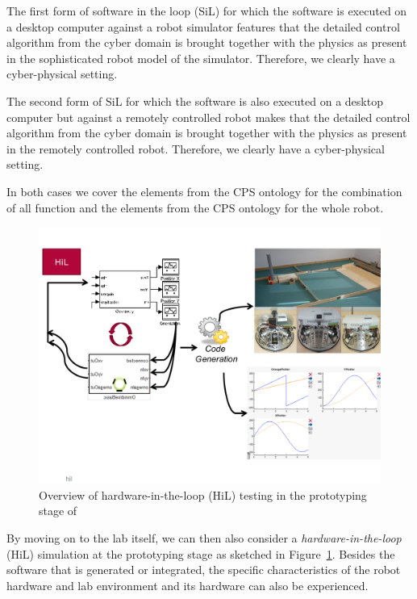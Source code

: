 %
The first form of software in the loop (SiL) for which the software is executed on a desktop computer against a robot simulator features that the detailed control algorithm from the cyber domain is brought together with the physics as present in the sophisticated robot model of the simulator. Therefore, we clearly have a cyber-physical setting. 

The second form of SiL for which the software is also executed on a desktop computer but against a remotely controlled robot makes that the detailed control algorithm from the cyber domain is brought together with the physics as present in the remotely controlled robot. Therefore, we clearly have a cyber-physical setting. 

In both cases we cover the elements \CPSCyberPart from the CPS ontology for the combination of all function and the elements \CPSPhysicalPart from the CPS ontology for the whole robot.


\begin{figure}[!htb]
\centering
\includegraphics[scale=0.33]{figures/hil.pdf}
\caption{Overview of hardware-in-the-loop (HiL) testing in the prototyping stage of \cite{Broekman&Notenboom2003}}
\label{fig:hil}
\end{figure}


%
By moving on to the lab itself, we can then also consider a \emph{hardware-in-the-loop} (HiL) simulation at the prototyping stage as sketched in Figure~\ref{fig:hil}. Besides the software that is generated or integrated, the specific characteristics of the robot hardware and lab environment and its hardware can also be experienced.


